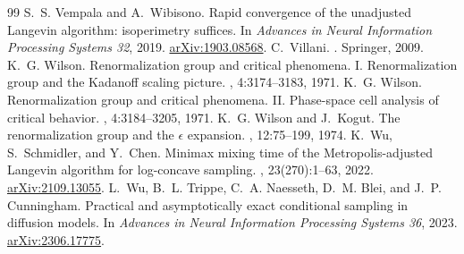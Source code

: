 \documentclass[10pt,a4paper]{amsart}
\numberwithin{equation}{section}
\begin{document}
\begin{thebibliography}{99}
 S.~S. Vempala and A.~Wibisono. \newblock Rapid convergence of the unadjusted {Langevin} algorithm: isoperimetry suffices. \newblock In {\em Advances in Neural Information Processing Systems 32}, 2019. \newblock \href{https://arxiv.org/abs/1903.08568}{arXiv:1903.08568}.
 C.~Villani. . \newblock Springer, 2009.
 K.~G. Wilson. \newblock Renormalization group and critical phenomena. {I}. {Renormalization} group and the {Kadanoff} scaling picture. , 4:3174--3183, 1971.
 K.~G. Wilson. \newblock Renormalization group and critical phenomena. {II}. {Phase}-space cell analysis of critical behavior. , 4:3184--3205, 1971.
 K.~G. Wilson and J.~Kogut. \newblock The renormalization group and the $\epsilon$ expansion. , 12:75--199, 1974.
 K.~Wu, S.~Schmidler, and Y.~Chen. \newblock Minimax mixing time of the {Metropolis}-adjusted {Langevin} algorithm for log-concave sampling. , 23(270):1--63, 2022. \newblock \href{https://arxiv.org/abs/2109.13055}{arXiv:2109.13055}.
 L.~Wu, B.~L. Trippe, C.~A. Naesseth, D.~M. Blei, and J.~P. Cunningham. \newblock Practical and asymptotically exact conditional sampling in diffusion models. \newblock In {\em Advances in Neural Information Processing Systems 36}, 2023. \newblock \href{https://arxiv.org/abs/2306.17775}{arXiv:2306.17775}.
\end{thebibliography}
\end{document}
